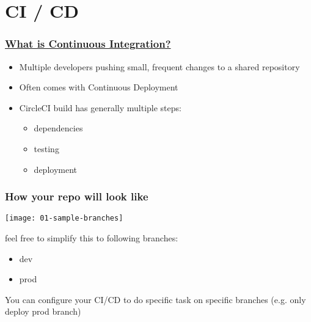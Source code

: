 \section{CI / CD}

\frame{\tableofcontents[currentsection]}

\begin{frame}
    \frametitle{\href{https://circleci.com/blog/what-is-continuous-integration}{What is Continuous Integration?}}   
    \begin{itemize}
        \item Multiple developers pushing small, frequent changes to a shared repository
        \item Often comes with Continuous Deployment
        \item CircleCI build has generally multiple steps:
        \begin{itemize}
            \item dependencies
            \item testing
            \item deployment
        \end{itemize}
    \end{itemize}
\end{frame}

\begin{frame}
    \frametitle{How your repo will look like}   
    \texttt{[image: 01-sample-branches]}
    
    feel free to simplify this to following branches:
    \begin{itemize}
        \item dev
        \item prod
    \end{itemize}
    You can configure your CI/CD to do specific task on specific branches (e.g. only deploy prod branch)
\end{frame}
